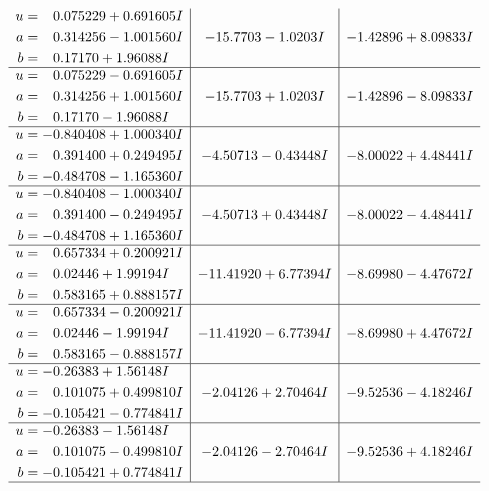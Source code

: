 \documentclass[1p]{elsarticle_modified}
\theoremstyle{definition}
\begin{document}
$$\begin{array}{c|c|c}
\begin{aligned}
u &= \phantom{-}0.075229 + 0.691605 I \\
a &= \phantom{-}0.314256 - 1.001560 I \\
b &= \phantom{-}0.17170 + 1.96088 I\end{aligned}
 & -15.7703 - 1.0203 I & -1.42896 + 8.09833 I \\ \hline\begin{aligned}
u &= \phantom{-}0.075229 - 0.691605 I \\
a &= \phantom{-}0.314256 + 1.001560 I \\
b &= \phantom{-}0.17170 - 1.96088 I\end{aligned}
 & -15.7703 + 1.0203 I & -1.42896 - 8.09833 I \\ \hline\begin{aligned}
u &= -0.840408 + 1.000340 I \\
a &= \phantom{-}0.391400 + 0.249495 I \\
b &= -0.484708 - 1.165360 I\end{aligned}
 & -4.50713 - 0.43448 I & -8.00022 + 4.48441 I \\ \hline\begin{aligned}
u &= -0.840408 - 1.000340 I \\
a &= \phantom{-}0.391400 - 0.249495 I \\
b &= -0.484708 + 1.165360 I\end{aligned}
 & -4.50713 + 0.43448 I & -8.00022 - 4.48441 I \\ \hline\begin{aligned}
u &= \phantom{-}0.657334 + 0.200921 I \\
a &= \phantom{-}0.02446 + 1.99194 I \\
b &= \phantom{-}0.583165 + 0.888157 I\end{aligned}
 & -11.41920 + 6.77394 I & -8.69980 - 4.47672 I \\ \hline\begin{aligned}
u &= \phantom{-}0.657334 - 0.200921 I \\
a &= \phantom{-}0.02446 - 1.99194 I \\
b &= \phantom{-}0.583165 - 0.888157 I\end{aligned}
 & -11.41920 - 6.77394 I & -8.69980 + 4.47672 I \\ \hline\begin{aligned}
u &= -0.26383 + 1.56148 I \\
a &= \phantom{-}0.101075 + 0.499810 I \\
b &= -0.105421 - 0.774841 I\end{aligned}
 & -2.04126 + 2.70464 I & -9.52536 - 4.18246 I \\ \hline\begin{aligned}
u &= -0.26383 - 1.56148 I \\
a &= \phantom{-}0.101075 - 0.499810 I \\
b &= -0.105421 + 0.774841 I\end{aligned}
 & -2.04126 - 2.70464 I & -9.52536 + 4.18246 I\\
 \hline 
 \end{array}$$\newpage
\end{document}
